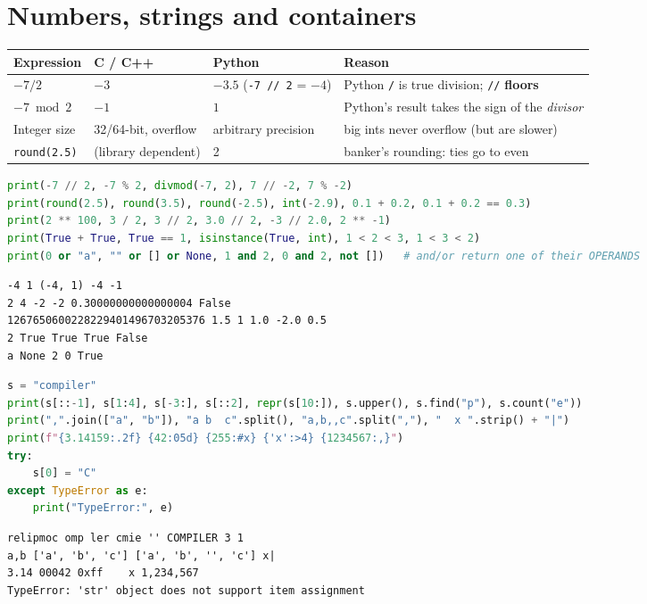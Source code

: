 \documentclass[10pt,a4paper,openany,oneside]{report}
\newcommand{\prio}[1]{\texorpdfstring{\ifcase#1\or{\color{gold}\ding{72}}\or{\color{gold}\ding{72}\ding{72}}\or{\color{gold}\ding{72}\ding{72}\ding{72}}\fi}{}}
\begin{document}
\section{Numbers, strings and containers \prio{3}}
\begin{center}\small
\begin{xltabular}{\textwidth}{@{}L{3.2cm}L{3.4cm}L{3.4cm}Y@{}}
\toprule
\textbf{Expression} & \textbf{C / C++} & \textbf{Python} & \textbf{Reason}\\
\midrule\endhead
$-7 / 2$ & $-3$ & $-3.5$ (\texttt{-7 // 2} = $-4$) & Python \texttt{/} is true division; \texttt{//} \textbf{floors}\\
$-7 \bmod 2$ & $-1$ & $1$ & Python's result takes the sign of the \emph{divisor}\\
Integer size & 32/64-bit, overflow & arbitrary precision & big ints never overflow (but are slower)\\
\texttt{round(2.5)} & (library dependent) & 2 & banker's rounding: ties go to even\\
\bottomrule
\end{xltabular}
\end{center}
\begin{lstlisting}[language={Python}]
print(-7 // 2, -7 % 2, divmod(-7, 2), 7 // -2, 7 % -2)
print(round(2.5), round(3.5), round(-2.5), int(-2.9), 0.1 + 0.2, 0.1 + 0.2 == 0.3)
print(2 ** 100, 3 / 2, 3 // 2, 3.0 // 2, -3 // 2.0, 2 ** -1)
print(True + True, True == 1, isinstance(True, int), 1 < 2 < 3, 1 < 3 < 2)
print(0 or "a", "" or [] or None, 1 and 2, 0 and 2, not [])   # and/or return one of their OPERANDS
\end{lstlisting}
\begin{lstlisting}[style=out,title={Answer: captured output}]
-4 1 (-4, 1) -4 -1
2 4 -2 -2 0.30000000000000004 False
1267650600228229401496703205376 1.5 1 1.0 -2.0 0.5
2 True True True False
a None 2 0 True
\end{lstlisting}
\begin{lstlisting}[language={Python},title={Strings: slicing, immutability, f-strings}]
s = "compiler"
print(s[::-1], s[1:4], s[-3:], s[::2], repr(s[10:]), s.upper(), s.find("p"), s.count("e"))
print(",".join(["a", "b"]), "a b  c".split(), "a,b,,c".split(","), "  x ".strip() + "|")
print(f"{3.14159:.2f} {42:05d} {255:#x} {'x':>4} {1234567:,}")
try:
    s[0] = "C"
except TypeError as e:
    print("TypeError:", e)
\end{lstlisting}
\begin{lstlisting}[style=out,title={Answer: captured output}]
relipmoc omp ler cmie '' COMPILER 3 1
a,b ['a', 'b', 'c'] ['a', 'b', '', 'c'] x|
3.14 00042 0xff    x 1,234,567
TypeError: 'str' object does not support item assignment
\end{lstlisting}
\end{document}
